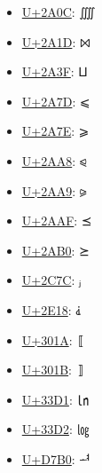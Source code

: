 \begin{itemize}
	\item \href{https://www.compart.com/en/unicode/U+2A0C}{U+2A0C}: ⨌
	\item \href{https://www.compart.com/en/unicode/U+2A1D}{U+2A1D}: ⨝
	\item \href{https://www.compart.com/en/unicode/U+2A3F}{U+2A3F}: ⨿
	\item \href{https://www.compart.com/en/unicode/U+2A7D}{U+2A7D}: ⩽
	\item \href{https://www.compart.com/en/unicode/U+2A7E}{U+2A7E}: ⩾
	\item \href{https://www.compart.com/en/unicode/U+2AA8}{U+2AA8}: ⪨
	\item \href{https://www.compart.com/en/unicode/U+2AA9}{U+2AA9}: ⪩
	\item \href{https://www.compart.com/en/unicode/U+2AAF}{U+2AAF}: ⪯
	\item \href{https://www.compart.com/en/unicode/U+2AB0}{U+2AB0}: ⪰
	\item \href{https://www.compart.com/en/unicode/U+2C7C}{U+2C7C}: ⱼ
	\item \href{https://www.compart.com/en/unicode/U+2E18}{U+2E18}: ⸘
	\item \href{https://www.compart.com/en/unicode/U+301A}{U+301A}: 〚
	\item \href{https://www.compart.com/en/unicode/U+301B}{U+301B}: 〛
	\item \href{https://www.compart.com/en/unicode/U+33D1}{U+33D1}: ㏑
	\item \href{https://www.compart.com/en/unicode/U+33D2}{U+33D2}: ㏒
	\item \href{https://www.compart.com/en/unicode/U+D7B0}{U+D7B0}: ힰ
\end{itemize}